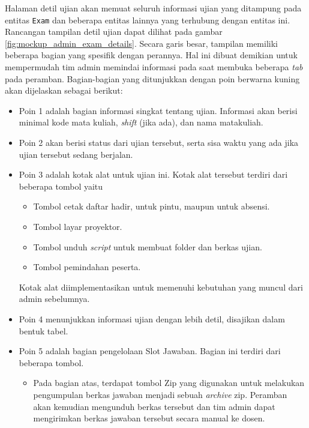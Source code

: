    Halaman detil ujian akan memuat seluruh informasi ujian yang ditampung pada
    entitas \texttt{Exam} dan beberapa entitas lainnya yang terhubung dengan
    entitas ini. Rancangan tampilan detil ujian dapat dilihat pada gambar
    \ref{fig:mockup_admin_exam_details}. Secara garis besar, tampilan memiliki
    beberapa bagian yang spesifik dengan perannya. Hal ini dibuat demikian untuk
    mempermudah tim admin memindai informasi pada saat membuka beberapa
    \textit{tab} pada peramban. Bagian-bagian yang ditunjukkan dengan poin
    berwarna kuning akan dijelaskan sebagai berikut:
    \begin{itemize}
        \item Poin 1 adalah bagian informasi singkat tentang ujian. Informasi
            akan berisi minimal kode mata kuliah, \textit{shift} (jika ada), dan nama
            matakuliah.
            
        \item Poin 2 akan berisi status dari ujian tersebut, serta sisa waktu
            yang ada jika ujian tersebut sedang berjalan.
            
        \item Poin 3 adalah kotak alat untuk ujian ini. Kotak alat tersebut
            terdiri dari beberapa tombol yaitu
            \begin{itemize}
                \item Tombol cetak daftar hadir, untuk pintu, maupun untuk absensi.
                \item Tombol layar proyektor.
                \item Tombol unduh \textit{script} untuk membuat folder dan berkas ujian.
                \item Tombol pemindahan peserta.
            \end{itemize}
            Kotak alat diimplementasikan untuk memenuhi kebutuhan yang muncul
            dari admin sebelumnya.
            
        \item Poin 4 menunjukkan informasi ujian dengan lebih detil, disajikan
        dalam bentuk tabel.
        
        \item Poin 5 adalah bagian pengelolaan Slot Jawaban. Bagian ini terdiri
        dari beberapa tombol.
            \begin{itemize}
                \item Pada bagian atas, terdapat tombol Zip yang digunakan untuk
                    melakukan pengumpulan berkas jawaban menjadi sebuah
                    \textit{archive} zip. Peramban akan kemudian mengunduh
                    berkas tersebut dan tim admin dapat mengirimkan berkas
                    jawaban tersebut secara manual ke dosen.
                    

\end{itemize}
\end{itemize}
